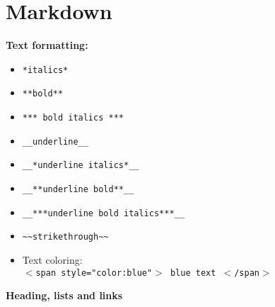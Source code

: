 \section{Markdown}
\textbf{Text formatting:}\\
\begin{itemize}
\item \texttt{*italics*} \\
\item \texttt{**bold**} \\
\item \texttt{*** bold italics ***}\\
\item \texttt{\_\_underline\_\_}\\
\item \texttt{\_\_*underline italics*\_\_}\\
\item \texttt{\_\_**underline bold**\_\_}
\item \texttt{\_\_***underline bold italics***\_\_}
\item \texttt{\~{}\~{}strikethrough\~{}\~{}}
\item Text coloring:\\
\texttt{$<$span style="color:blue"$>$ blue text $<$/span$>$}

\end{itemize}

\textbf{Heading, lists and links}\\


